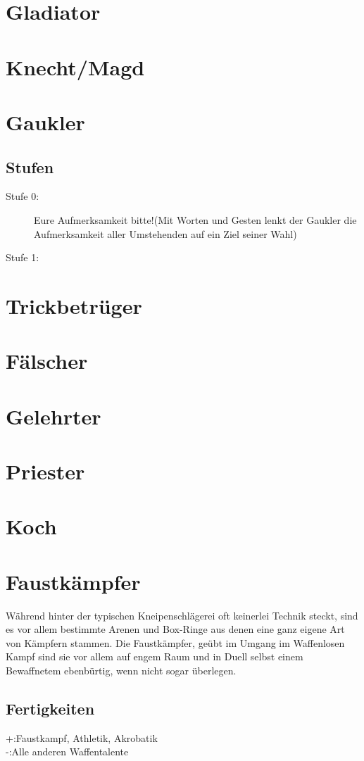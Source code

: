 \documentclass[a4paper,12pt,oneside]{book}
\begin{document}
\section{Gladiator}
\section{Knecht/Magd}
\section{Gaukler}
\subsection{Stufen}
\begin{description}
\item[Stufe 0:]Eure Aufmerksamkeit bitte!(Mit Worten und Gesten lenkt der Gaukler die Aufmerksamkeit aller Umstehenden auf ein Ziel seiner Wahl)
\item[Stufe 1:]
\end{description}
\section{Trickbetrüger}
\section{Fälscher}
\section{Gelehrter}
\section{Priester}
\section{Koch}
\section{Faustkämpfer}
Während hinter der typischen Kneipenschlägerei oft keinerlei Technik steckt, sind es vor allem bestimmte Arenen und Box-Ringe aus denen eine ganz eigene Art von Kämpfern stammen. Die Faustkämpfer, geübt im Umgang im Waffenlosen Kampf sind sie vor allem auf engem Raum und in Duell selbst einem Bewaffnetem ebenbürtig, wenn nicht sogar überlegen.
\subsection{Fertigkeiten}
+:Faustkampf, Athletik, Akrobatik
\\-:Alle anderen Waffentalente 
\end{document}
